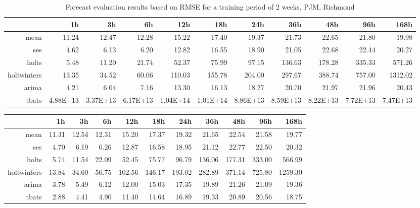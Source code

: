 \begin{landscape}
\begin{table}[ht]
\centering
\vspace*{-0.2in}
\begin{tabular}{rrrrrrrrrrr}
  \hline
 & 1h & 3h & 6h & 12h & 18h & 24h & 36h & 48h & 96h & 168h \\ 
  \hline
mean & 11.24 & 12.47 & 12.28 & 15.22 & 17.40 & 19.37 & 21.73 & 22.65 & 21.80 & 19.98 \\ 
  ses & 4.62 & 6.13 & 6.20 & 12.82 & 16.55 & 18.90 & 21.05 & 22.68 & 22.44 & 20.27 \\ 
  holts & 5.48 & 11.20 & 21.74 & 52.37 & 75.99 & 97.15 & 136.63 & 178.28 & 335.33 & 571.26 \\ 
  holtwinters & 13.35 & 34.52 & 60.06 & 110.03 & 155.78 & 204.00 & 297.67 & 388.74 & 757.00 & 1312.02 \\ 
  arima & 4.21 & 6.04 & 7.16 & 13.30 & 16.13 & 18.27 & 20.70 & 21.97 & 21.96 & 20.43 \\ 
  tbats & 4.88E+13 & 3.37E+13 & 6.17E+13 & 1.04E+14 & 1.01E+14 & 8.86E+13 & 8.59E+13 & 8.22E+13 & 7.72E+13 & 7.47E+13 \\ 
   \hline
\end{tabular}
\caption{Forecast evaluation results based on RMSE for a training period of 2 weeks, PJM, Richmond}
\label{tab:app_results_richmond_2weeks}
\end{table}
\begin{table}[ht]
\centering
\vspace*{-0.1in}
\begin{tabular}{rrrrrrrrrrr}
  \hline
 & 1h & 3h & 6h & 12h & 18h & 24h & 36h & 48h & 96h & 168h \\ 
  \hline
mean & 11.31 & 12.54 & 12.31 & 15.20 & 17.37 & 19.32 & 21.65 & 22.54 & 21.58 & 19.77 \\ 
  ses & 4.70 & 6.19 & 6.26 & 12.87 & 16.58 & 18.95 & 21.12 & 22.77 & 22.50 & 20.32 \\ 
  holts & 5.74 & 11.54 & 22.09 & 52.45 & 75.77 & 96.79 & 136.06 & 177.31 & 333.00 & 566.99 \\ 
  holtwinters & 13.84 & 34.60 & 56.75 & 102.56 & 146.17 & 193.02 & 282.89 & 371.14 & 725.80 & 1259.30 \\ 
  arima & 3.78 & 5.49 & 6.12 & 12.00 & 15.03 & 17.35 & 19.89 & 21.26 & 21.09 & 19.36 \\ 
  tbats & 2.88 & 4.41 & 4.90 & 11.40 & 14.64 & 16.89 & 19.33 & 20.89 & 20.56 & 18.75 \\ 

\end{tabular}
\end{table}
\end{landscape}
